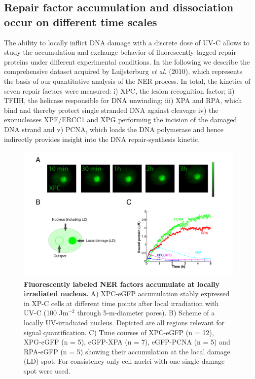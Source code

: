 \subsection{Repair factor accumulation and dissociation occur on different time scales}
\label{subsec:AccuFlipExp}
The ability to locally inflict DNA damage with a discrete dose of UV-C allows to study the accumulation and exchange behavior of fluorescently tagged repair proteins under different experimental conditions. In the following we describe the comprehensive dataset acquired by Luijsterburg \textit{et al.} (2010)\cite{Luijsterburg2010}, which represents the basis of our quantitative analysis of the NER process. In total, the kinetics of seven repair factors were measured: i) XPC, the lesion recognition factor; ii) TFIIH, the helicase responsible for DNA unwinding; iii) XPA and RPA, which bind and thereby protect single stranded DNA against cleavage iv) the exonucleases XPF/ERCC1 and XPG performing the incision of the damaged DNA strand and v) PCNA, which loads the DNA polymerase and hence indirectly provides insight into the DNA repair-synthesis kinetic. \\
\begin{figure}[htbp]
\begin{center}
\includegraphics[width=1\textwidth]{Abbildungen/figure2_2.pdf}
\caption{\textbf{Fluorescently labeled NER factors accumulate at locally irradiated nucleus.} A) XPC-eGFP accumulation stably expressed in XP-C cells at different time points after local irradiation with UV-C (100 J$\text{m}^{-\text{2}}$ through 5-\textmu m-diameter pores). B) Scheme of a locally UV-irradiated nucleus. Depicted are all regions relevant for signal quantification. C) Time courses of XPC-eGFP (n = 12), XPG-eGFP (n = 5), eGFP-XPA (n = 7), eGFP-PCNA (n = 5) and RPA-eGFP (n = 5) showing their accumulation at the local damage (LD) spot. For consistency only cell nuclei with one single damage spot were used.}
\label{fig:accuImage}
\end{center}
\end{figure} 
